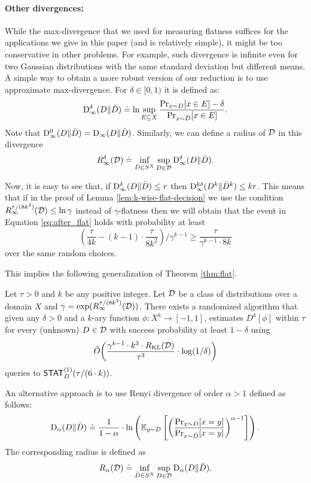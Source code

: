 \paragraph{Other divergences:} While the max-divergence that we used for measuring flatness suffices for the applications we give in this paper (and is relatively simple), it might be too conservative in other problems. For example, such divergence is infinite even for two Gaussian distributions with the same standard deviation but different means. A simple way to obtain a more robust version of our reduction is to use approximate max-divergence. For $\delta \in [0,1)$ it is defined as: $${\mathrm{D}}_\infty^\delta(D\|\bar D) \doteq \ln \sup_{E \subseteq X} \frac{\Pr_{x\sim D}[x\in E]-\delta}{\Pr_{x\sim \bar D}[x\in E]} .$$ Note that ${\mathrm{D}}_\infty^0(D\|\bar D) = {\mathrm{D}}_\infty(D\|\bar D)$. Similarly, we can define a radius of $\mathcal{D}$ in this divergence $$R_\infty^\delta(\mathcal{D}) \doteq \inf_{\bar D \in S^X} \sup_{D\in \mathcal{D}} {\mathrm{D}}_\infty^\delta(D\|\bar D) .$$

Now, it is easy to see that, if ${\mathrm{D}}_\infty^\delta(D\|\bar D) \leq r$ then ${\mathrm{D}}_\infty^{k\delta}(D^k\|\bar D^k) \leq kr$. This means that if in the proof of Lemma \ref{lem:k-wise-flat-decision} we use the condition
$R_\infty^{\tau/(8k^2)}(\mathcal{D}) \leq \ln \gamma$ instead of $\gamma$-flatness then we will obtain that the event in Equation \eqref{eq:after_flat} holds with probability at least $$ \left( \frac{\tau}{4k} - (k-1) \cdot  \frac{\tau}{8k^2}\right) / \gamma^{k-1} \geq \frac{\tau}{\gamma^{k-1} \cdot 8k}$$ over the same random choices.

This implies the following generalization of Theorem \ref{thm:flat}.
\begin{theorem}\label{thm:flat-approx}
Let $\tau > 0$ and $k$ be any positive integer. Let $\mathcal{D}$ be a class of distributions over a domain $X$ and $\gamma = \exp(R_\infty^{\tau/(8k^2)}(\mathcal{D}))$. There exists a randomized algorithm that given any $\delta > 0$ and a $k$-ary function $\phi: X^k \to [-1,1]$, estimates $D^k[\phi]$ within $\tau$  for every (unknown) $D \in \mathcal{D}$ with success probability at least $1-\delta$ using $$\tilde{O}\bigg( \frac{\gamma^{k-1} \cdot k^3 \cdot R_{\mathrm{KL}}(\mathcal{D})}{\tau^3} \cdot \log (1/\delta)\bigg)$$
queries to $\mathsf{STAT}_D^{(1)}(\tau/(6 \cdot k))$.\end{theorem}

An alternative approach is to use Renyi divergence of order $\alpha > 1$ defined as follows:
 $${\mathrm{D}}_\alpha(D\|\bar D) \doteq \frac{1}{1-\alpha} \cdot \ln \left (\mathbb{E}_{y \sim D} \left[\left(\frac{\Pr_{x\sim D}[x=y]}{\Pr_{x\sim \bar D}[x=y]}\right)^{\alpha-1}\right] \right).$$ The corresponding radius is defined as $$R_\alpha(\mathcal{D}) \doteq \inf_{\bar D \in S^X} \sup_{D\in \mathcal{D}} {\mathrm{D}}_\alpha(D\|\bar D) .$$

